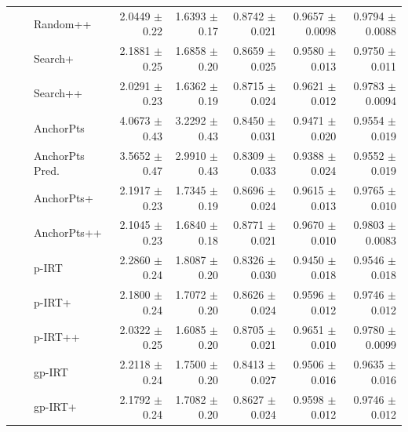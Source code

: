 \begin{longtable}{llp{}rrrrr}
 &  & Random++ & 2.0449 {\scriptsize $\pm$ 0.22} & 1.6393 {\scriptsize $\pm$ 0.17} & 0.8742 {\scriptsize $\pm$ 0.021} & 0.9657 {\scriptsize $\pm$ 0.0098} & 0.9794 {\scriptsize $\pm$ 0.0088} \\
 &  & Search+ & 2.1881 {\scriptsize $\pm$ 0.25} & 1.6858 {\scriptsize $\pm$ 0.20} & 0.8659 {\scriptsize $\pm$ 0.025} & 0.9580 {\scriptsize $\pm$ 0.013} & 0.9750 {\scriptsize $\pm$ 0.011} \\
 &  & Search++ & 2.0291 {\scriptsize $\pm$ 0.23} & 1.6362 {\scriptsize $\pm$ 0.19} & 0.8715 {\scriptsize $\pm$ 0.024} & 0.9621 {\scriptsize $\pm$ 0.012} & 0.9783 {\scriptsize $\pm$ 0.0094} \\
 &  & AnchorPts & 4.0673 {\scriptsize $\pm$ 0.43} & 3.2292 {\scriptsize $\pm$ 0.43} & 0.8450 {\scriptsize $\pm$ 0.031} & 0.9471 {\scriptsize $\pm$ 0.020} & 0.9554 {\scriptsize $\pm$ 0.019} \\
 &  & AnchorPts Pred. & 3.5652 {\scriptsize $\pm$ 0.47} & 2.9910 {\scriptsize $\pm$ 0.43} & 0.8309 {\scriptsize $\pm$ 0.033} & 0.9388 {\scriptsize $\pm$ 0.024} & 0.9552 {\scriptsize $\pm$ 0.019} \\
 &  & AnchorPts+ & 2.1917 {\scriptsize $\pm$ 0.23} & 1.7345 {\scriptsize $\pm$ 0.19} & 0.8696 {\scriptsize $\pm$ 0.024} & 0.9615 {\scriptsize $\pm$ 0.013} & 0.9765 {\scriptsize $\pm$ 0.010} \\
 &  & AnchorPts++ & 2.1045 {\scriptsize $\pm$ 0.23} & 1.6840 {\scriptsize $\pm$ 0.18} & 0.8771 {\scriptsize $\pm$ 0.021} & 0.9670 {\scriptsize $\pm$ 0.010} & 0.9803 {\scriptsize $\pm$ 0.0083} \\
 &  & p-IRT & 2.2860 {\scriptsize $\pm$ 0.24} & 1.8087 {\scriptsize $\pm$ 0.20} & 0.8326 {\scriptsize $\pm$ 0.030} & 0.9450 {\scriptsize $\pm$ 0.018} & 0.9546 {\scriptsize $\pm$ 0.018} \\
 &  & p-IRT+ & 2.1800 {\scriptsize $\pm$ 0.24} & 1.7072 {\scriptsize $\pm$ 0.20} & 0.8626 {\scriptsize $\pm$ 0.024} & 0.9596 {\scriptsize $\pm$ 0.012} & 0.9746 {\scriptsize $\pm$ 0.012} \\
 &  & p-IRT++ & 2.0322 {\scriptsize $\pm$ 0.25} & 1.6085 {\scriptsize $\pm$ 0.20} & 0.8705 {\scriptsize $\pm$ 0.021} & 0.9651 {\scriptsize $\pm$ 0.010} & 0.9780 {\scriptsize $\pm$ 0.0099} \\
 &  & gp-IRT & 2.2118 {\scriptsize $\pm$ 0.24} & 1.7500 {\scriptsize $\pm$ 0.20} & 0.8413 {\scriptsize $\pm$ 0.027} & 0.9506 {\scriptsize $\pm$ 0.016} & 0.9635 {\scriptsize $\pm$ 0.016} \\
 &  & gp-IRT+ & 2.1792 {\scriptsize $\pm$ 0.24} & 1.7082 {\scriptsize $\pm$ 0.20} & 0.8627 {\scriptsize $\pm$ 0.024} & 0.9598 {\scriptsize $\pm$ 0.012} & 0.9746 {\scriptsize $\pm$ 0.012} \\

\end{longtable}
